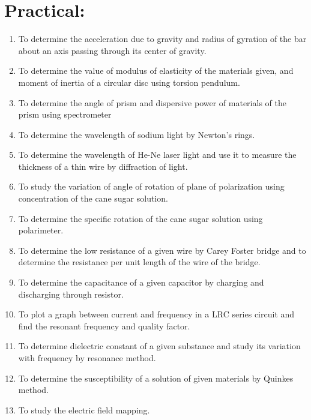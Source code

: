 \section*{Practical:}
\begin{enumerate}
    \item To determine the acceleration due to gravity and radius of gyration of the bar about an axis passing through its center of gravity.
    \item To determine the value of modulus of elasticity of the materials given, and moment of inertia of a circular disc using torsion pendulum.
    \item To determine the angle of prism and dispersive power of materials of the prism using spectrometer
    \item To determine the wavelength of sodium light by Newton's rings.
    \item To determine the wavelength of He-Ne laser light and use it to measure the thickness of a thin wire by diffraction of light.
    \item To study the variation of angle of rotation of plane of polarization using concentration of the cane sugar solution.
    \item To determine the specific rotation of the cane sugar solution using polarimeter.
    \item To determine the low resistance of a given wire by Carey Foster bridge and to determine the resistance per unit length of the wire of the bridge.
    \item To determine the capacitance of a given capacitor by charging and discharging through resistor.
    \item To plot a graph between current and frequency in a LRC series circuit and find the resonant frequency and quality factor.
    \item To determine dielectric constant of a given substance and study its variation with frequency by resonance method.
    \item To determine the susceptibility of a solution of given materials by Quinkes method.
    \item To study the electric field mapping.
    
\end{enumerate}


